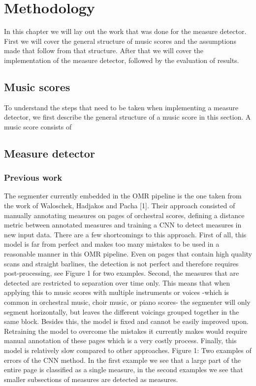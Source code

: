 \chapter{Methodology}

In this chapter we will lay out the work that was done for the measure detector. First we will cover the general structure of music scores and the assumptions made that follow from that structure. After that we will cover the implementation of the measure detector, followed by the evaluation of results.

\section{Music scores}
To understand the steps that need to be taken when implementing a measure detector, we first describe the general structure of a music score in this section. A music score consists of 

\section{Measure detector}
\subsection{Previous work}
The segmenter currently embedded in the OMR pipeline is the one taken from the work of Waloschek, Hadjakos and Pacha [1]. Their approach consisted of manually annotating measures on pages of orchestral scores, defining a distance metric between annotated measures and training a CNN to detect measures in new input data. There are a few shortcomings to this approach. First of all, this model is far from perfect and makes too many mistakes to be used in a reasonable manner in this OMR pipeline. Even on pages that contain high quality scans and straight barlines, the detection is not perfect and therefore requires post-processing, see Figure 1 for two examples. Second, the measures that are detected are restricted to separation over time only. This means that when applying this to music scores with multiple instruments or voices -which is common in orchestral music, choir music, or piano scores- the segmenter will only segment horizontally, but leaves the different voicings grouped together in the same block. Besides this, the model is fixed and cannot be easily improved upon. Retraining the model to overcome the mistakes it currently makes would require manual annotation of these pages which is a very costly process. Finally, this model is relatively slow compared to other approaches.
Figure 1: Two examples of errors of the CNN method. In the first example we see that a large part of the entire page is classified as a single measure, in the second examples we see that smaller subsections of measures are detected as measures.

